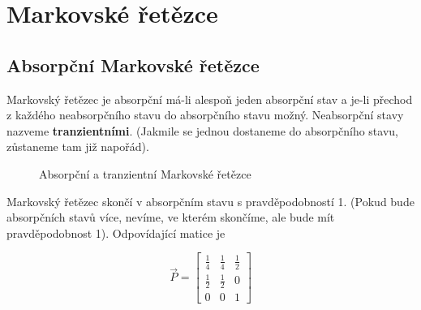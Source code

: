 \chapter{Markovské řetězce}
\section{Absorpční Markovské řetězce}
Markovský řetězec je absorpční má-li alespoň jeden absorpční stav a je-li přechod z každého neabsorpčního stavu do absorpčního stavu možný. Neabsorpční stavy nazveme \textbf{tranzientními}. (Jakmile se jednou dostaneme do absorpčního stavu, zůstaneme tam již napořád).

\begin{figure}

\caption{Absorpční a tranzientní Markovské řetězce}
\end{figure}

Markovský řetězec skončí v absorpčním stavu s pravděpodobností 1. (Pokud bude absorpčních stavů více, nevíme, ve kterém skončíme, ale bude mít pravděpodobnost 1). Odpovídající matice je

\[ \vec{P} =
\begin{bmatrix}
\frac{1}{4} & \frac{1}{4} & \frac{1}{2}\\
\frac{1}{2} & \frac{1}{2} & 0\\
0 & 0 & 1
\end{bmatrix}
\]

